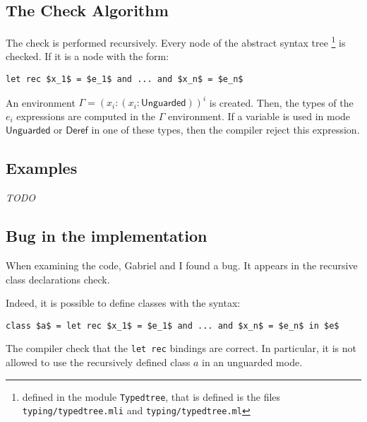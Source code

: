 \documentclass{article}
\newcommand{\Deref}{\mathsf{Deref}}
\newcommand{\Unguarded}{\mathsf{Unguarded}}
\begin{document}


\subsection{The Check Algorithm}


The check is performed recursively. Every node of the abstract syntax tree
\footnote{defined in the module \texttt{Typedtree}, that is defined is the
files \texttt{typing/typedtree.mli} and \texttt{typing/typedtree.ml}} is
checked. If it is a node with the form:
\begin{lstlisting}[mathescape=true]
  let rec $x_1$ = $e_1$ and ... and $x_n$ = $e_n$
\end{lstlisting}
An environment $\Gamma = (x_i: (x_i: \Unguarded))^i$ is created.
Then, the types of the $e_i$ expressions are computed in the $\Gamma$
environment. If a variable is used in mode $\Unguarded$ or $\Deref$ in one of
these types, then the compiler reject this expression.


\subsection{Examples}
\textit{TODO}

\subsection{Bug in the implementation}
When examining the code, Gabriel and I found a bug. It appears in the recursive
class declarations check.

Indeed, it is possible to define classes with the syntax:
\begin{lstlisting}[mathescape=true]
class $a$ = let rec $x_1$ = $e_1$ and ... and $x_n$ = $e_n$ in $e$
\end{lstlisting}
The compiler check that the \lstinline|let rec| bindings are correct. In
particular, it is not allowed to use the recursively defined class $a$ in an
unguarded mode.
\end{document}
